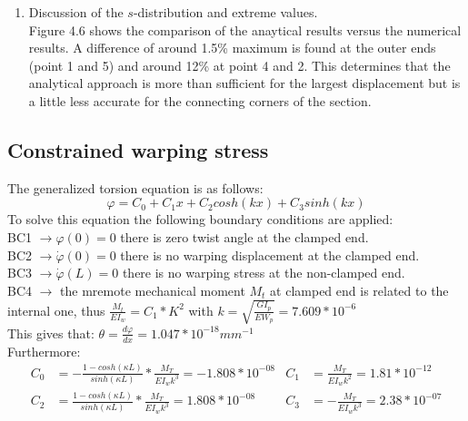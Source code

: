 \begin{enumerate}[label=\roman*., leftmargin=*]
  
  \item Discussion of the $s$-distribution and extreme values.\\

  Figure 4.6  shows the comparison of the anaytical results versus the numerical results. A difference of around 1.5\% maximum is found at the outer ends (point 1 and 5) and around 12\% at point 4 and 2. This determines that the analytical approach is more than sufficient for the largest displacement but is a little less accurate for the connecting corners of the section.
\end{enumerate}

\subsection{Constrained warping stress}
\label{sec:a4-c}
The generalized torsion equation is as follows:
\begin{equation}
    \varphi =C_0+C_1x+C_2cosh(kx)+C_3sinh(kx)
\end{equation}
To solve this equation the following boundary conditions are applied:\\
BC1 $\rightarrow \varphi(0) = 0$ there is zero twist angle at the clamped end. \\
BC2 $\rightarrow \dot\varphi (0) = 0$ there is no warping displacement at the clamped end.\\
BC3 $\rightarrow \dot\varphi (L) = 0$ there is no warping stress at the non-clamped end.\\
BC4 $\rightarrow$ the mremote mechanical moment $M_t$ at clamped end is related to the internal one, thus $\frac{M_t}{EI_w} =C_1*K^2$ with $k = \sqrt{\frac{GI_p}{EW_p}} = 7.609*10^{-6} $\\
This gives that: $\theta = \frac{d\varphi}{dx} =  1.047*10^{-18} mm^{-1}$\\
Furthermore: \\
\begin{align}
    C_0 &= -\frac{1-cosh(\kappa L)}{sinh(\kappa L)}*\frac{M_T}{EI_wk^3} = -1.808*10^{-08} &
    C_1 &= \frac{M_T}{EI_wk^2} = 1.81*10^{-12} \\
    C_2 &= \frac{1-cosh(\kappa L)}{sinh(\kappa L)}*\frac{M_T}{EI_wk^3} = 1.808*10^{-08} &
    C_3 &= -\frac{M_T}{EI_wk^3} =  2.38*10^{-07}
\end{align}


